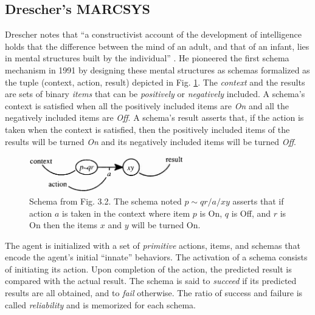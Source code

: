 \documentclass[runningheads]{llncs}
\begin{document}
\subsection{Drescher's MARCSYS}

Drescher notes that ``a constructivist account of the development of intelligence holds that the difference between the mind of an adult, and that of an infant, lies in mental structures built by the individual'' \cite[p. 41]{drescher_made-up_1991}.
He pioneered the first schema mechanism in 1991 by designing these mental structures as schemas formalized as the tuple (context, action, result) depicted in Fig. \ref{fig:drescher}. 
The \textit{context} and the results are sets of binary \textit{items} that can be \textit{positively} or \textit{negatively} included. 
A schema's context is satisfied when all the positively included items are \textit{On} and all the negatively included items are \textit{Off}. 
A schema's result asserts that, if the action is taken when the context is satisfied, then the positively included items of the results will be turned \textit{On} and its negatively included items will be turned \textit{Off}.

\begin{figure}
	\centering
	\includegraphics[width=0.6\textwidth]{Figure_2_schema_drescher.png}
	\caption{Schema from \cite{drescher_made-up_1991} Fig. 3.2.
		The schema noted $p \!\sim\! qr/a/xy$ asserts that if action $a$ is taken in the context where item $p$ is On, $q$ is Off, and $r$ is On then the items $x$ and $y$ will be turned On.} 
	\label{fig:drescher}
\end{figure}

The agent is initialized with a set of \textit{primitive} actions, items, and schemas that encode the agent's initial ``innate'' behaviors. 
The activation of a schema consists of initiating its action. 
Upon completion of the action, the predicted result is compared with the actual result.
The schema is said to \textit{succeed} if its predicted results are all obtained, and to \textit{fail} otherwise. 
The ratio of success and failure is called \textit{reliability} and is memorized for each schema.  
\end{document}
